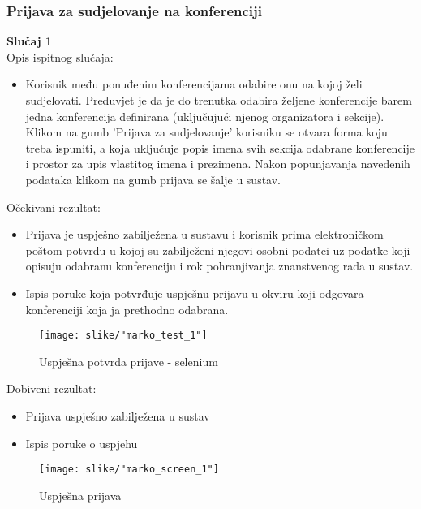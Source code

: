 		\subsubsection{Prijava za sudjelovanje na konferenciji}
		\textbf{Slučaj 1}\\
		Opis ispitnog slučaja:
		\begin{itemize}
			\item Korisnik među ponuđenim konferencijama odabire onu na kojoj želi sudjelovati. Preduvjet je da je do trenutka odabira željene konferencije barem jedna konferencija definirana (uključujući njenog organizatora i sekcije). Klikom na gumb 'Prijava za sudjelovanje' korisniku se otvara forma koju treba ispuniti, a koja uključuje popis imena svih sekcija odabrane konferencije i prostor za upis vlastitog imena i prezimena. Nakon popunjavanja navedenih podataka klikom na gumb prijava se šalje u sustav.
		\end{itemize}
		Očekivani rezultat:
		\begin{itemize}
			\item Prijava je uspješno zabilježena u sustavu i korisnik prima elektroničkom poštom potvrdu u kojoj su zabilježeni njegovi osobni podatci uz podatke koji opisuju odabranu konferenciju i rok pohranjivanja znanstvenog rada u sustav.
		\end{itemize}
		\begin{itemize}
			\item Ispis poruke koja potvrđuje uspješnu prijavu u okviru koji odgovara konferenciji koja ja prethodno odabrana.
		\end{itemize}
		\begin{figure}[H]
			\texttt{[image: slike/"marko\_test\_1"]}
			\centering
			\caption{Uspješna potvrda prijave - selenium}
			\label{mala_labelica}
		\end{figure}
		Dobiveni rezultat:
		\begin{itemize}
			\item Prijava uspješno zabilježena u sustav
		\end{itemize}
		\begin{itemize}
			\item Ispis poruke o uspjehu
		\end{itemize}
		\begin{figure}[H]
			\texttt{[image: slike/"marko\_screen\_1"]}
			\centering
			\caption{Uspješna prijava}
			\label{mala_labelica}
		\end{figure}
		

